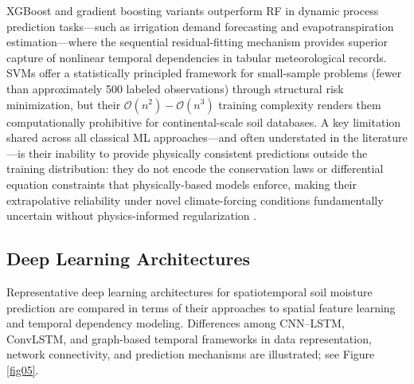 \documentclass[land,review,accept,pdftex,oneauthor]{Definitions/mdpi}
\begin{document}
{XGBoost and gradient boosting variants outperform RF in dynamic process prediction tasks---such as irrigation demand forecasting and evapotranspiration estimation---where the sequential residual-fitting mechanism provides superior capture of nonlinear temporal dependencies in tabular meteorological records. SVMs offer a statistically principled framework for small-sample problems (fewer than approximately 500 labeled observations) through structural risk minimization, but their $\mathcal{O}(n^2)-\mathcal{O}(n^3)$ training complexity renders them computationally prohibitive for continental-scale soil databases. A key limitation shared across all classical ML approaches---and often understated in the literature---is their inability to provide physically consistent predictions outside the training distribution: they do not encode the conservation laws or differential equation constraints that physically-based models enforce, making their extrapolative reliability under novel climate-forcing conditions fundamentally uncertain without physics-informed regularization \citep{willard2022integrating}.}

\subsection{Deep Learning Architectures}
Representative deep learning architectures for spatiotemporal soil moisture prediction are compared in terms of their approaches to spatial feature learning and temporal dependency modeling. Differences among CNN–LSTM, ConvLSTM, and graph-based temporal frameworks in data representation, network connectivity, and prediction mechanisms are illustrated; see Figure \ref{fig05}.
\end{document}
